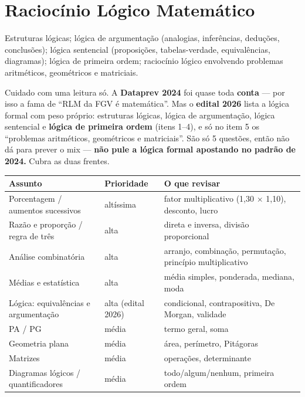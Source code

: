 \chapter{Raciocínio Lógico Matemático}
\label{cap:rlm}

\begin{edital}
Estruturas lógicas; lógica de argumentação (analogias, inferências,
deduções, conclusões); lógica sentencial (proposições, tabelas-verdade,
equivalências, diagramas); lógica de primeira ordem; raciocínio lógico
envolvendo problemas aritméticos, geométricos e matriciais.
\end{edital}

\begin{pegadinha}
Cuidado com uma leitura só. A \textbf{Dataprev 2024} foi quase toda
\textbf{conta} --- por isso a fama de ``RLM da FGV é matemática''. Mas o
\textbf{edital 2026} lista a lógica formal com peso próprio: estruturas
lógicas, lógica de argumentação, lógica sentencial e \textbf{lógica de
primeira ordem} (itens 1--4), e só no item 5 os ``problemas aritméticos,
geométricos e matriciais''. São só 5 questões, então não dá para prever o
mix --- \textbf{não pule a lógica formal apostando no padrão de 2024.} Cubra
as duas frentes.
\end{pegadinha}

\begin{center}
\begin{tabular}{@{}p{5cm}p{2cm}p{4.4cm}@{}}
\toprule
\textbf{Assunto} & \textbf{Prioridade} & \textbf{O que revisar} \\
\midrule
Porcentagem / aumentos sucessivos & altíssima & fator multiplicativo (1,30 $\times$ 1,10), desconto, lucro \\
Razão e proporção / regra de três & alta & direta e inversa, divisão proporcional \\
Análise combinatória & alta & arranjo, combinação, permutação, princípio multiplicativo \\
Médias e estatística & alta & média simples, ponderada, mediana, moda \\
Lógica: equivalências e argumentação & alta (edital 2026) & condicional, contrapositiva, De Morgan, validade \\
PA / PG & média & termo geral, soma \\
Geometria plana & média & área, perímetro, Pitágoras \\
Matrizes & média & operações, determinante \\
Diagramas lógicos / quantificadores & média & todo/algum/nenhum, primeira ordem \\
\bottomrule
\end{tabular}
\end{center}

